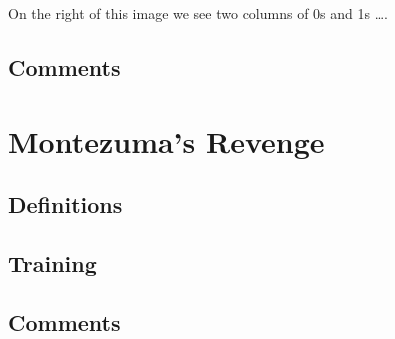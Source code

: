 On the right of this image we see two columns of 0s and 1s \dots.


\subsection{Comments}


\let\sectionbreak\savedsectionbreak

\section{Montezuma's Revenge}
\subsection{Definitions}
\subsection{Training}
\subsection{Comments}

